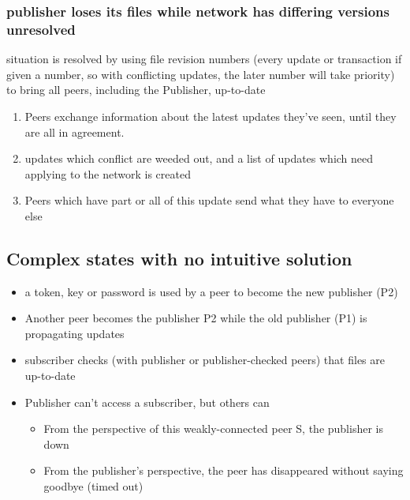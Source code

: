 \documentclass[12pt,a4paper,]{adreport}
\begin{document}
\subsubsection{publisher loses its files while network has differing
versions
unresolved}\label{publisher-loses-its-files-while-network-has-differing-versions-unresolved}

situation is resolved by using file revision numbers (every update or
transaction if given a number, so with conflicting updates, the later
number will take priority) to bring all peers, including the Publisher,
up-to-date

\begin{enumerate}
\def\labelenumi{\arabic{enumi}.}
\itemsep1pt\parskip0pt
\item
  Peers exchange information about the latest updates they've seen,
  until they are all in agreement.
\item
  updates which conflict are weeded out, and a list of updates which
  need applying to the network is created
\item
  Peers which have part or all of this update send what they have to
  everyone else
\end{enumerate}

\subsection{Complex states with no intuitive
solution}\label{complex-states-with-no-intuitive-solution}

\begin{itemize}
\itemsep1pt\parskip0pt
\item
  a token, key or password is used by a peer to become the new publisher
  (P2)
\item
  Another peer becomes the publisher P2 while the old publisher (P1) is
  propagating updates
\item
  subscriber checks (with publisher or publisher-checked peers) that
  files are up-to-date
\item
  Publisher can't access a subscriber, but others can

  \begin{itemize}
  \itemsep1pt\parskip0pt
  \item
    From the perspective of this weakly-connected peer S, the publisher
    is down
  \item
    From the publisher's perspective, the peer has disappeared without
    saying goodbye (timed out)
  \end{itemize}
\end{itemize}
\end{document}
